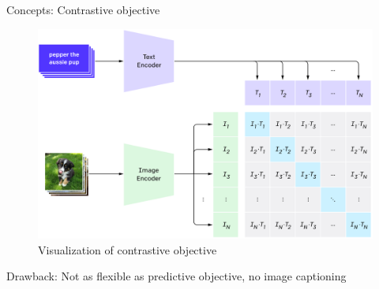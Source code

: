 \documentclass[xcolor=dvipsnames]{beamer}
\begin{document}
\begin{frame}{Concepts: Contrastive objective}
  \begin{figure}[ht]
    \centering
    \includegraphics[width=0.7\linewidth]{../../figures/02-04-text-support-img/contrastive-pre-training}
    \caption{Visualization of contrastive objective \parencite{openai2021clipblog}}
  \end{figure}

  Drawback: Not as flexible as predictive objective, no image captioning
\end{frame}
\end{document}
